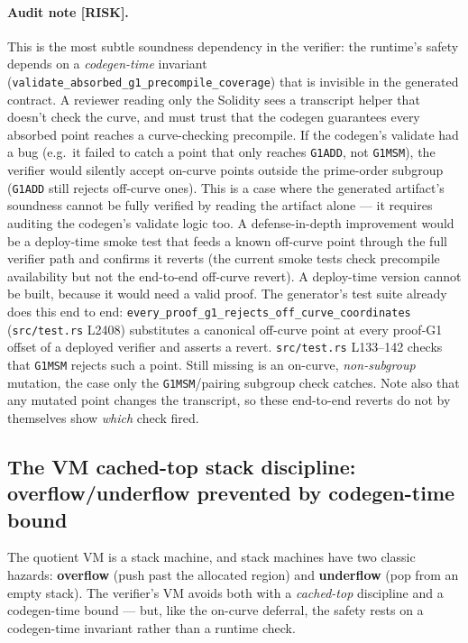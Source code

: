 \paragraph{Audit note [RISK].} This is the most subtle soundness
dependency in the verifier: the runtime's safety depends on a
\emph{codegen-time} invariant
(\texttt{validate\_absorbed\_\allowbreak{}g1\_precompile\_\allowbreak{}coverage}) that is
invisible in the generated contract. A reviewer reading
only the Solidity sees a transcript helper that doesn't check the
curve, and must trust that the codegen guarantees every absorbed
point reaches a curve-checking precompile. If the codegen's
validate had a bug (e.g.\ it failed to catch a point that only
reaches \texttt{G1ADD}, not \texttt{G1MSM}), the verifier would
silently accept on-curve points outside the prime-order subgroup
(\texttt{G1ADD} still rejects off-curve ones). This is a case where the
generated artifact's soundness cannot be fully verified by reading
the artifact alone --- it requires auditing the codegen's validate
logic too. A defense-in-depth improvement would be a deploy-time
smoke test that feeds a known off-curve point through the full
verifier path and confirms it reverts (the current smoke tests
check precompile availability but not the end-to-end off-curve
revert).  A deploy-time version cannot be built,
because it would need a valid proof. The generator's test suite
already does this end to end: \texttt{every\_proof\_g1\_\allowbreak{}rejects\_off\_\allowbreak{}curve\_coordinates}
(\texttt{src/test.rs} L2408) substitutes a canonical off-curve point
at every proof-G1 offset of a deployed verifier and asserts a
revert. \texttt{src/test.rs} L133--142 checks that
\texttt{G1MSM} rejects such a point. Still missing is an
on-curve, \emph{non-subgroup} mutation, the case only the
\texttt{G1MSM}/pairing subgroup check catches. Note also that any
mutated point changes the transcript, so these end-to-end reverts do
not by themselves show \emph{which} check fired.

\subsection{The VM cached-top stack discipline: overflow/underflow prevented by codegen-time bound}
\label{sec:pr-vmstack}

The quotient VM is a stack machine, and stack machines have two
classic hazards: \textbf{overflow} (push past the allocated
region) and \textbf{underflow} (pop from an empty stack). The
verifier's VM avoids both with a \emph{cached-top} discipline and
a codegen-time bound --- but, like the on-curve deferral, the
safety rests on a codegen-time invariant rather than a runtime
check.

